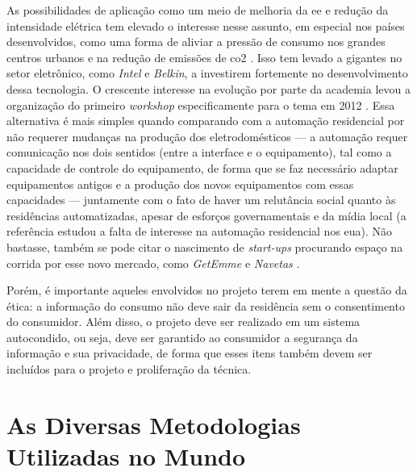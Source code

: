 As possibilidades de aplicação como um meio de melhoria da \gls{ee} e
redução da intensidade elétrica tem elevado o interesse nesse assunto,
em especial nos países desenvolvidos, como uma forma de aliviar
a pressão de consumo nos grandes centros urbanos e na redução de
emissões de \gls{co2} \cite{nilm_zeifman_review_2011}.
Isso tem levado a gigantes no setor eletrônico, como \emph{Intel} e
\emph{Belkin}, a investirem fortemente no desenvolvimento dessa
tecnologia. O crescente interesse na evolução por parte da academia
levou a organização do primeiro \emph{workshop} especificamente para o
tema em 2012 \cite{workshop_nilm}. Essa alternativa é mais simples
quando comparando com a automação residencial por não requerer
mudanças na produção dos eletrodomésticos --- a automação requer
comunicação nos dois sentidos (entre a interface e o equipamento), tal
como a capacidade de controle do equipamento, de forma que se faz
necessário adaptar equipamentos antigos e a produção dos novos
equipamentos com essas capacidades --- juntamente com o fato de haver
um relutância social quanto às residências automatizadas, apesar de
esforços governamentais e da mídia local \cite{Lipoff_Automation_2010}
(a referência estudou a falta de interesse na automação residencial
nos \gls{eua}). Não bastasse, também se pode citar o nascimento de
\emph{start-ups} procurando espaço na corrida por esse novo mercado,
como \emph{GetEmme} \cite{getemme_site} e \emph{Navetas}
\cite{navetas_site}.

Porém, é importante aqueles envolvidos no projeto terem em mente a
questão da ética: a informação do consumo não deve sair da residência
sem o consentimento do consumidor. Além disso, o projeto deve ser
realizado em um sistema autocondido, ou seja, deve ser garantido ao
consumidor a segurança da informação e sua privacidade, de forma que
esses itens também devem ser incluídos para o projeto e proliferação
da técnica.

\section{As Diversas Metodologias Utilizadas no Mundo}
\label{sec:nilm_mundo}

